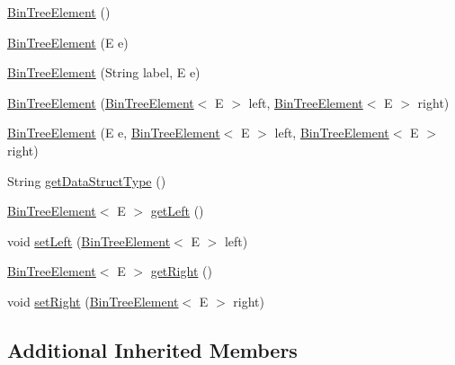 \begin{DoxyCompactItemize}
\item 
\hyperlink{classbridges_1_1base_1_1_bin_tree_element_ad6dbf38d53a78be561039c46bde8bc47}{Bin\+Tree\+Element} ()
\item 
\hyperlink{classbridges_1_1base_1_1_bin_tree_element_a2d31fa068f962ced8702fdb4b36c9186}{Bin\+Tree\+Element} (E e)
\item 
\hyperlink{classbridges_1_1base_1_1_bin_tree_element_aac0e300f53d5c1c89b747a1f2c5d54c9}{Bin\+Tree\+Element} (String label, E e)
\item 
\hyperlink{classbridges_1_1base_1_1_bin_tree_element_ab402fac72353087b1b93e82db007e1d7}{Bin\+Tree\+Element} (\hyperlink{classbridges_1_1base_1_1_bin_tree_element}{Bin\+Tree\+Element}$<$ E $>$ left, \hyperlink{classbridges_1_1base_1_1_bin_tree_element}{Bin\+Tree\+Element}$<$ E $>$ right)
\item 
\hyperlink{classbridges_1_1base_1_1_bin_tree_element_a37f3def3cdf4a9eccf577d0ff3c704e9}{Bin\+Tree\+Element} (E e, \hyperlink{classbridges_1_1base_1_1_bin_tree_element}{Bin\+Tree\+Element}$<$ E $>$ left, \hyperlink{classbridges_1_1base_1_1_bin_tree_element}{Bin\+Tree\+Element}$<$ E $>$ right)
\item 
String \hyperlink{classbridges_1_1base_1_1_bin_tree_element_a60fa936692e168f70fb8567090c98883}{get\+Data\+Struct\+Type} ()
\item 
\hyperlink{classbridges_1_1base_1_1_bin_tree_element}{Bin\+Tree\+Element}$<$ E $>$ \hyperlink{classbridges_1_1base_1_1_bin_tree_element_aeb6fd894af8e158c9c48dd0749d1bd22}{get\+Left} ()
\item 
void \hyperlink{classbridges_1_1base_1_1_bin_tree_element_a5bcc2c1374a49f7ab2523ce53d204c30}{set\+Left} (\hyperlink{classbridges_1_1base_1_1_bin_tree_element}{Bin\+Tree\+Element}$<$ E $>$ left)
\item 
\hyperlink{classbridges_1_1base_1_1_bin_tree_element}{Bin\+Tree\+Element}$<$ E $>$ \hyperlink{classbridges_1_1base_1_1_bin_tree_element_aa3855c26617ada7248a9d4f83cf455b7}{get\+Right} ()
\item 
void \hyperlink{classbridges_1_1base_1_1_bin_tree_element_abc40e3ed4cfaf4b74aacfd3657e89ebc}{set\+Right} (\hyperlink{classbridges_1_1base_1_1_bin_tree_element}{Bin\+Tree\+Element}$<$ E $>$ right)
\end{DoxyCompactItemize}
\subsection*{Additional Inherited Members}


